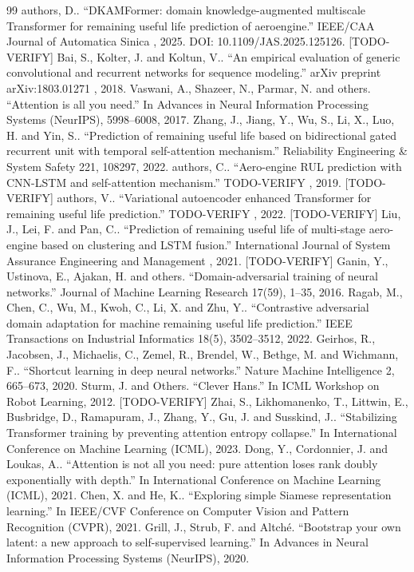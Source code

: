 \begin{thebibliography}{99}
 authors, D.. ``DKAMFormer: domain knowledge-augmented multiscale Transformer for remaining useful life prediction of aeroengine.'' IEEE/CAA Journal of Automatica Sinica , 2025. DOI: 10.1109/JAS.2025.125126. [TODO-VERIFY]
 Bai, S., Kolter, J. and Koltun, V.. ``An empirical evaluation of generic convolutional and recurrent networks for sequence modeling.'' arXiv preprint arXiv:1803.01271 , 2018.
 Vaswani, A., Shazeer, N., Parmar, N. and others. ``Attention is all you need.'' In Advances in Neural Information Processing Systems (NeurIPS), 5998--6008, 2017.
 Zhang, J., Jiang, Y., Wu, S., Li, X., Luo, H. and Yin, S.. ``Prediction of remaining useful life based on bidirectional gated recurrent unit with temporal self-attention mechanism.'' Reliability Engineering \& System Safety 221, 108297, 2022.
 authors, C.. ``Aero-engine RUL prediction with CNN-LSTM and self-attention mechanism.'' TODO-VERIFY , 2019. [TODO-VERIFY]
 authors, V.. ``Variational autoencoder enhanced Transformer for remaining useful life prediction.'' TODO-VERIFY , 2022. [TODO-VERIFY]
 Liu, J., Lei, F. and Pan, C.. ``Prediction of remaining useful life of multi-stage aero-engine based on clustering and LSTM fusion.'' International Journal of System Assurance Engineering and Management , 2021. [TODO-VERIFY]
 Ganin, Y., Ustinova, E., Ajakan, H. and others. ``Domain-adversarial training of neural networks.'' Journal of Machine Learning Research 17(59), 1--35, 2016.
 Ragab, M., Chen, C., Wu, M., Kwoh, C., Li, X. and Zhu, Y.. ``Contrastive adversarial domain adaptation for machine remaining useful life prediction.'' IEEE Transactions on Industrial Informatics 18(5), 3502--3512, 2022.
 Geirhos, R., Jacobsen, J., Michaelis, C., Zemel, R., Brendel, W., Bethge, M. and Wichmann, F.. ``Shortcut learning in deep neural networks.'' Nature Machine Intelligence 2, 665--673, 2020.
 Sturm, J. and Others. ``Clever Hans.'' In ICML Workshop on Robot Learning, 2012. [TODO-VERIFY]
 Zhai, S., Likhomanenko, T., Littwin, E., Busbridge, D., Ramapuram, J., Zhang, Y., Gu, J. and Susskind, J.. ``Stabilizing Transformer training by preventing attention entropy collapse.'' In International Conference on Machine Learning (ICML), 2023.
 Dong, Y., Cordonnier, J. and Loukas, A.. ``Attention is not all you need: pure attention loses rank doubly exponentially with depth.'' In International Conference on Machine Learning (ICML), 2021.
 Chen, X. and He, K.. ``Exploring simple Siamese representation learning.'' In IEEE/CVF Conference on Computer Vision and Pattern Recognition (CVPR), 2021.
 Grill, J., Strub, F. and Altch\'e. ``Bootstrap your own latent: a new approach to self-supervised learning.'' In Advances in Neural Information Processing Systems (NeurIPS), 2020.
\end{thebibliography}